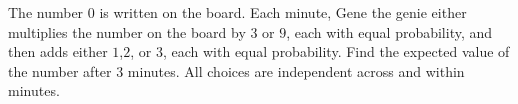 The number $0$ is written on the board. Each minute, Gene the genie either multiplies the number on the board by $3$ or $9$, each with equal probability, and then adds either $1$,$2$, or $3$, each with equal probability. Find the expected value of the number after $3$ minutes. All choices are independent across and within minutes.
